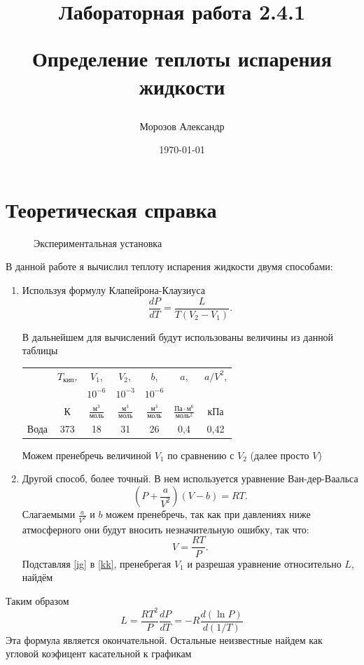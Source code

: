 \documentclass[a4paper,12pt]{article}
\author{Морозов Александр}
\title{Лабораторная работа 2.4.1

Определение теплоты испарения жидкости}
\date{\today}
\begin{document}
	
\maketitle 
	
	
\newpage





\section{Теоретическая справка}

\begin{figure}[h]	\label{plan1}
	\caption{Экспериментальная установка}
\end{figure}	
В данной работе я вычислил теплоту испарения жидкости двумя способами:
\begin{enumerate}
    \item Используя формулу Клапейрона-Клаузиуса
    \begin{equation} \label{kk}
 \dfrac{dP}{dT}= \dfrac{L}{T(V_2 - V_1)}. 
\end{equation}

В дальнейшем для вычислений будут использованы величины из данной таблицы

\begin{center}
\begin{tabular}{|l|*{6}{c|}} 
	\hline
	& $T_{кип}$,&$ V_1$, &$ V_2 , $&$ b$,& $ a$, & $a / V^2$, \\
	   &  & $10^{-6}$ &$10^{-3}$&$10^{-6}$&& \\
	& К &$\frac{м^3}{моль} $&$\frac{м^3}{моль} $&$\frac{м^3}{моль} $&$\frac{Па \cdot м^6}{моль^2} $ &кПа\\ 
	\hline 
	Вода & 373 & 18 & 31 & 26 & 0,4& 0,42 \\ 
        \hline
	\end{tabular}
\end{center}
 Можем пренебречь величиной $V_1$ по сравнению с $V_2$ (далее просто $V$)

\item Другой способ, более точный. В нем используется уравнение Ван-дер-Ваальса
\begin{equation} \label{vv}
\left(P + \dfrac{a}{V^2}\right)\left(V - b\right)= RT.
\end{equation}
Слагаемыми $\frac{a}{V^2}$ и $b$ можем пренебречь, так как при давлениях ниже атмосферного они будут вносить незначительную ошибку, так что:
\begin{equation} \label{ig}
V = \frac{RT}{P}.
\end{equation}
Подставляя \eqref{ig} в \eqref{kk}, пренебрегая $V_1$ и разрешая уравнение относительно $L$, найдём 
\end{enumerate}
Таким образом
\begin{equation} \label{res}
L = \frac{RT^2}{P}\frac{dP}{dT}=-R\frac{d(\ln P)}{d(1/T)}
\end{equation}
Эта формула является окончательной. 
Остальные неизвестные найдем как угловой коэфицент касательной к графикам
\end{document}
